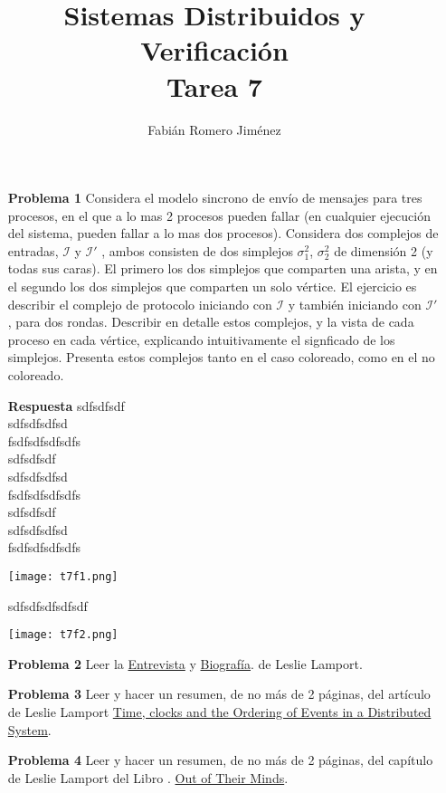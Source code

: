 \documentclass{article}
\title{Sistemas Distribuidos y Verificación \\ Tarea 7}
\author{Fabián Romero Jiménez}
\date{}
\begin{document}
\maketitle
\begin{enumerate}

\item[{\bf Problema 1}] Considera el modelo sincrono de envío de mensajes para tres procesos,  en el que a lo mas 2 procesos pueden fallar (en cualquier ejecución del sistema, pueden fallar a lo mas dos procesos). Considera dos complejos de entradas,  $\mathcal{I}$ y $\mathcal{I}'$ , ambos consisten de dos simplejos $\sigma^2_1$, $\sigma^2_2$ de dimensión 2 (y todas sus caras). El primero los dos simplejos que comparten una arista, y en el segundo los dos simplejos que comparten un solo
vértice. El ejercicio es describir el complejo de protocolo iniciando con $\mathcal{I}$
y también iniciando con $\mathcal{I}'$ , para dos rondas. Describir en detalle estos
complejos, y la vista de cada proceso en cada vértice, explicando intuitivamente el signficado de los simplejos. Presenta estos complejos tanto en el caso coloreado, como en el no coloreado.

\item[{\bf Respuesta}]
sdfsdfsdf\\
sdfsdfsdfsd\\
fsdfsdfsdfsdfs\\
sdfsdfsdf\\
sdfsdfsdfsd\\
fsdfsdfsdfsdfs\\
sdfsdfsdf\\
sdfsdfsdfsd\\
fsdfsdfsdfsdfs\\
\begin{center}
  \texttt{[image: t7f1.png]}
\end{center}
sdfsdfsdfsdfsdf
\begin{center}
  \texttt{[image: t7f2.png]}
\end{center}

\item[{\bf Problema 2}] Leer la \href{http://www.technologyreview.com/news/525621/three-questions-for-leslie-lamport-winner-of-computings-top-prize/}{Entrevista} y \href{http://research.microsoft.com/en-us/news/features/lamport-031814.aspx}{Biografía}. de Leslie Lamport.

\item[{\bf Problema 3}]Leer y hacer un resumen, de no más de 2 páginas, del artículo de Leslie Lamport \href{http://research.microsoft.com/en-us/um/people/lamport/pubs/time-clocks.pdf}{Time, clocks and the Ordering of Events in a Distributed System}.

\item[{\bf Problema 4}] Leer y hacer un resumen, de no más de 2 páginas, del capítulo de Leslie Lamport del Libro . \href{http://books.google.com.mx/books?id=-0tDZX3z-8UC&lpg=PA120&ots=mzsbVaWNYn&dq=out%20of%20their%20minds%20leslie%20lamport&pg=PA120#v=onepage&q=out%20of%20their%20minds%20leslie%20lamport&f=false}{Out of Their Minds}.

\end{enumerate}
\end{document}
